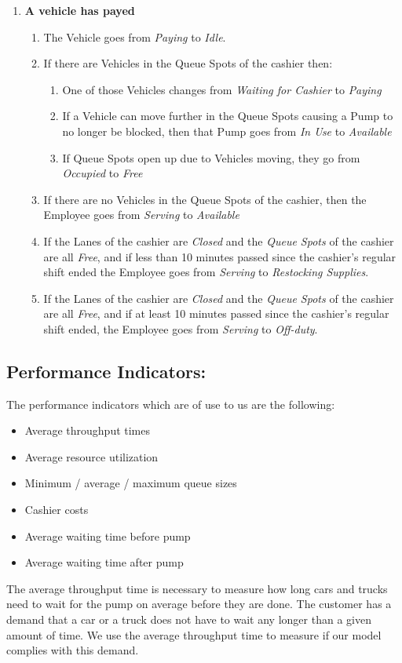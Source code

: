 \begin{enumerate}
	\item \textbf{A vehicle has payed}
	\begin{enumerate}
		\item The Vehicle goes from \textit{Paying} to \textit{Idle}.
		\item If there are Vehicles in the Queue Spots of the cashier then:
		\begin{enumerate}
			\item One of those Vehicles changes from \textit{Waiting for Cashier} to \textit{Paying}
			\item If a Vehicle can move further in the Queue Spots causing a Pump to no longer be blocked, then that Pump goes from \textit{In Use} to \textit{Available}
			\item If Queue Spots open up due to Vehicles moving, they go from \textit{Occupied} to \textit{Free}
		\end{enumerate}
		\item If there are no Vehicles in the Queue Spots of the cashier, then the Employee goes from \textit{Serving} to \textit{Available}
		\item If the Lanes of the cashier are \textit{Closed} and the \textit{Queue Spots} of the cashier are all \textit{Free}, and if less than 10 minutes passed since the cashier's regular shift ended the Employee goes from \textit{Serving} to \textit{Restocking Supplies}. 
		\item If the Lanes of the cashier are \textit{Closed} and the \textit{Queue Spots} of the cashier are all \textit{Free}, and if at least 10 minutes passed since the cashier's regular shift ended, the Employee goes from \textit{Serving} to \textit{Off-duty}. 
	\end{enumerate}
\end{enumerate}

\subsection{Performance Indicators:}
The performance indicators which are of use to us are the following:
\begin{itemize}[noitemsep, topsep=0pt]	
\item Average throughput times
\item Average resource utilization
\item Minimum / average / maximum queue sizes
\item Cashier costs
\item Average waiting time before pump
\item Average waiting time after pump
\end{itemize}
The average throughput time is necessary to measure how long cars and trucks need to wait for the pump on average before they are done. 
The customer has a demand that a car or a truck does not have to wait any longer than a given amount of time. 
We use the average throughput time to measure if our model complies with this demand. 

